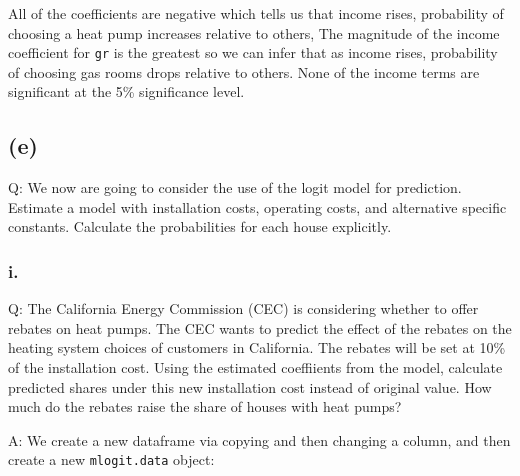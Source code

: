\documentclass[
]{article}
\newenvironment{Shaded}{\begin{snugshade}}{\end{snugshade}}
\newcommand{\DataTypeTok}[1]{\textcolor[rgb]{0.13,0.29,0.53}{#1}}
\newcommand{\DecValTok}[1]{\textcolor[rgb]{0.00,0.00,0.81}{#1}}
\newcommand{\FloatTok}[1]{\textcolor[rgb]{0.00,0.00,0.81}{#1}}
\newcommand{\KeywordTok}[1]{\textcolor[rgb]{0.13,0.29,0.53}{\textbf{#1}}}
\newcommand{\NormalTok}[1]{#1}
\newcommand{\OperatorTok}[1]{\textcolor[rgb]{0.81,0.36,0.00}{\textbf{#1}}}
\newcommand{\StringTok}[1]{\textcolor[rgb]{0.31,0.60,0.02}{#1}}
\begin{document}
All of the coefficients are negative which tells us that income rises,
probability of choosing a heat pump increases relative to others, The
magnitude of the income coefficient for \texttt{gr} is the greatest so
we can infer that as income rises, probability of choosing gas rooms
drops relative to others. None of the income terms are significant at
the 5\% significance level.

\hypertarget{e}{%
\subsection{(e)}\label{e}}

Q: We now are going to consider the use of the logit model for
prediction. Estimate a model with installation costs, operating costs,
and alternative specific constants. Calculate the probabilities for each
house explicitly.

\hypertarget{i.-3}{%
\subsubsection{i.}\label{i.-3}}

Q: The California Energy Commission (CEC) is considering whether to
offer rebates on heat pumps. The CEC wants to predict the effect of the
rebates on the heating system choices of customers in California. The
rebates will be set at 10\% of the installation cost. Using the
estimated coeffiients from the model, calculate predicted shares under
this new installation cost instead of original value. How much do the
rebates raise the share of houses with heat pumps?

A: We create a new dataframe via copying and then changing a column, and
then create a new \texttt{mlogit.data} object:

\begin{Shaded}
\end{Shaded}
\end{document}
